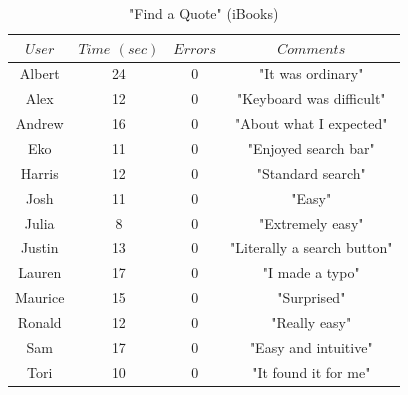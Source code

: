 \documentclass[journal, a4paper]{IEEEtran}
\begin{document}
    \begin{table}[!hbt]
		\begin{center}
		\caption{"Find a Quote" (iBooks)}
		\label{tab:task3learniBooks}
		\begin{tabular}{|c|c|c|c|}
			\hline
			$User$ & $Time$ $(sec)$ & $Errors$ & $Comments$\\
			\hline
            Albert & 24 & 0 & "It was ordinary"\\
			\hline
			Alex & 12 & 0 & "Keyboard was difficult"\\
			\hline
            Andrew & 16 & 0 & "About what I expected"\\
			\hline
			Eko & 11 & 0 & "Enjoyed search bar"\\
			\hline
            Harris & 12 & 0 & "Standard search"\\
			\hline
			Josh & 11 & 0 & "Easy"\\
			\hline
            Julia & 8 & 0 & "Extremely easy"\\
			\hline
            Justin & 13 & 0 & "Literally a search button"\\
			\hline
            Lauren & 17 & 0 & "I made a typo"\\
			\hline
            Maurice & 15 & 0 & "Surprised"\\
			\hline
            Ronald & 12 & 0 & "Really easy"\\
			\hline
            Sam & 17 & 0 & "Easy and intuitive"\\
			\hline
            Tori & 10 & 0 & "It found it for me"\\
			\hline
		\end{tabular}
		\end{center}
	\end{table}
    
\end{document}
